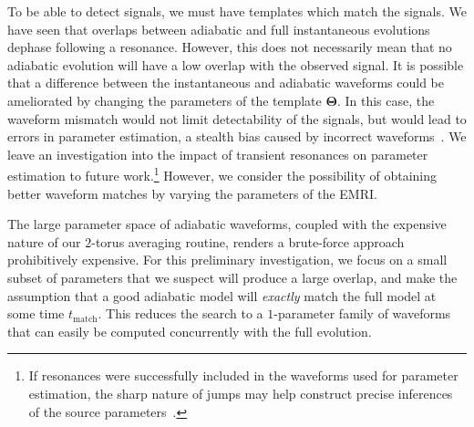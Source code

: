 \documentclass[aps,prd,amsfonts,amssymb,amsmath,nofootinbib,showpacs,superscriptaddress,twocolumn]{revtex4}
\begin{document}
To be able to detect signals, we must have templates which match the signals. We have seen that overlaps between adiabatic and full instantaneous evolutions dephase following a resonance. However, this does not necessarily mean that no adiabatic evolution will have a low overlap with the observed signal. It is possible that a difference between the instantaneous and adiabatic waveforms could be ameliorated by changing the parameters of the template $\boldsymbol{\Theta}$. In this case, the waveform mismatch would not limit detectability of the signals, but would lead to errors in parameter estimation, a stealth bias caused by incorrect waveforms~\cite{Cutler2007}. We leave an investigation into the impact of transient resonances on parameter estimation to future work.\footnote{If resonances were successfully included in the waveforms used for parameter estimation, the sharp nature of jumps may help construct precise inferences of the source parameters~\cite{Mandel2014}.} However, we consider the possibility of obtaining better waveform matches by varying the parameters of the EMRI.

The large parameter space of adiabatic waveforms, coupled with the expensive nature of our $2$-torus averaging routine, renders a brute-force approach prohibitively expensive. For this preliminary investigation, we focus on a small subset of parameters that we suspect will produce a large overlap, and make the assumption that a good adiabatic model will \emph{exactly} match the full model at some time $t_{\mathrm{match}}$. This reduces the search to a $1$-parameter family of waveforms that can easily be computed concurrently with the full evolution.

\end{document}
